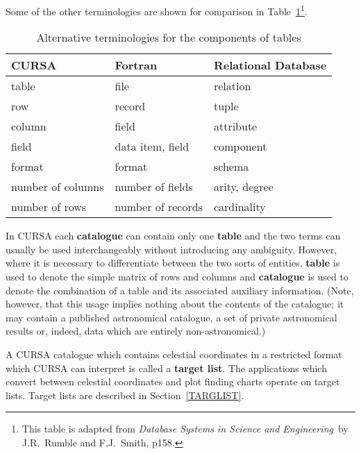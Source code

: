 \documentclass[twoside,11pt]{article}
\renewcommand{\_}{\texttt{\symbol{95}}}
\begin{document}
Some of the other terminologies are shown for comparison in 
Table~\ref{TABLE_NOT}\footnote{This table is adapted from {\it
Database Systems in Science and Engineering}\, by J.R.~Rumble and
F.J.~Smith\cite{RUMBLE}, p158.}.

\begin{table}[htbp]

\begin{center}
\begin{tabular}{lll}
CURSA             &  Fortran           &  Relational Database \\ \hline
table             &  file              &  relation      \\
row               &  record            &  tuple         \\
column            &  field             &  attribute     \\
field             &  data item, field  &  component     \\
format            &  format            &  schema        \\
number of columns &  number of fields  &  arity, degree \\
number of rows    &  number of records &  cardinality   \\
\end{tabular}
\end{center}

\caption{Alternative terminologies for the components of tables
\label{TABLE_NOT} }

\end{table}

In CURSA each {\bf catalogue} can contain only one {\bf
table} and the two terms can usually be used interchangeably without
introducing any ambiguity. However, where it is necessary to
differentiate between the two sorts of entities, {\bf table} is used
to denote the simple matrix of rows and columns and {\bf catalogue} is
used to denote the combination of a table and its associated auxiliary
information. (Note, however, that this usage implies nothing about the 
contents of the catalogue; it may contain a published astronomical catalogue,
a set of private astronomical results or, indeed, data which are entirely 
non-astronomical.)

A CURSA catalogue which contains celestial coordinates in a restricted
format which CURSA can interpret is called a {\bf target list}.  The
applications which convert between celestial coordinates and plot
finding charts operate on target lists.  Target lists are described in
Section~\ref{TARGLIST}.
\end{document}
